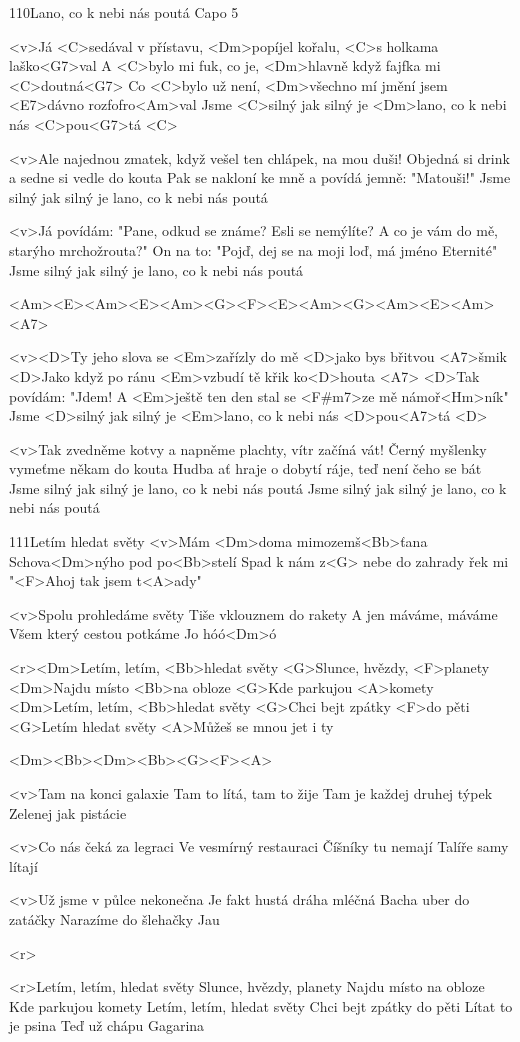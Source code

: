 \begin{song}[Traband]{110}{Lano, co k nebi nás poutá}{}
Capo 5

<v>Já <C>sedával v přístavu, <Dm>popíjel kořalu, <C>s holkama laško<G7>val
A <C>bylo mi fuk, co je, <Dm>hlavně když fajfka mi <C>doutná<G7>
Co <C>bylo už není, <Dm>všechno mí jmění jsem <E7>dávno rozfofro<Am>val
Jsme <C>silný jak silný je <Dm>lano, co k nebi nás <C>pou<G7>tá <C>

<v>Ale najednou zmatek, když vešel ten chlápek, na mou duši!
Objedná si drink a sedne si vedle do kouta
Pak se nakloní ke mně a povídá jemně: "Matouši!"
Jsme silný jak silný je lano, co k nebi nás poutá

<v>Já povídám: "Pane, odkud se známe? Esli se nemýlíte?
A co je vám do mě, starýho mrchožrouta?"
On na to: "Pojď, dej se na moji loď, má jméno Eternité"
Jsme silný jak silný je lano, co k nebi nás poutá

<Am><E><Am><E><Am><G><F><E><Am><G><Am><E><Am><A7>

<v><D>Ty jeho slova se <Em>zařízly do mě <D>jako bys břitvou <A7>šmik
<D>Jako když po ránu <Em>vzbudí tě křik ko<D>houta <A7>
<D>Tak povídám: "Jdem! A <Em>ještě ten den stal se <F#m7>ze mě námoř<Hm>ník"
Jsme <D>silný jak silný je <Em>lano, co k nebi nás <D>pou<A7>tá <D>

<v>Tak zvedněme kotvy a napněme plachty, vítr začíná vát!
Černý myšlenky vymeťme někam do kouta
Hudba ať hraje o dobytí ráje, teď není čeho se bát
Jsme silný jak silný je lano, co k nebi nás poutá
Jsme silný jak silný je lano, co k nebi nás poutá
\end{song}
\begin{song}{111}{Letím hledat světy}{}
<v>Mám <Dm>doma mimozemš<Bb>ťana
Schova<Dm>nýho pod po<Bb>stelí
Spad k nám z<G> nebe do zahrady
řek mi "<F>Ahoj tak jsem t<A>ady"

<v>Spolu prohledáme světy
Tiše vklouznem do rakety
A jen máváme, máváme
Všem který cestou potkáme
Jo hóó<Dm>ó

<r><Dm>Letím, letím, <Bb>hledat světy
<G>Slunce, hvězdy, <F>planety
<Dm>Najdu místo <Bb>na obloze
<G>Kde parkujou <A>komety
<Dm>Letím, letím, <Bb>hledat světy
<G>Chci bejt zpátky <F>do pěti
<G>Letím hledat světy
<A>Můžeš se mnou jet i ty

<Dm><Bb><Dm><Bb><G><F><A>

<v>Tam na konci galaxie
Tam to lítá, tam to žije
Tam je každej druhej týpek
Zelenej jak pistácie

<v>Co nás čeká za legraci
Ve vesmírný restauraci
Číšníky tu nemají
Talíře samy lítají

<v>Už jsme v půlce nekonečna
Je fakt hustá dráha mléčná
Bacha uber do zatáčky
Narazíme do šlehačky
Jau

<r>

<r>Letím, letím, hledat světy
Slunce, hvězdy, planety
Najdu místo na obloze
Kde parkujou komety
Letím, letím, hledat světy
Chci bejt zpátky do pěti
Lítat to je psina
Teď už chápu Gagarina
\end{song}

